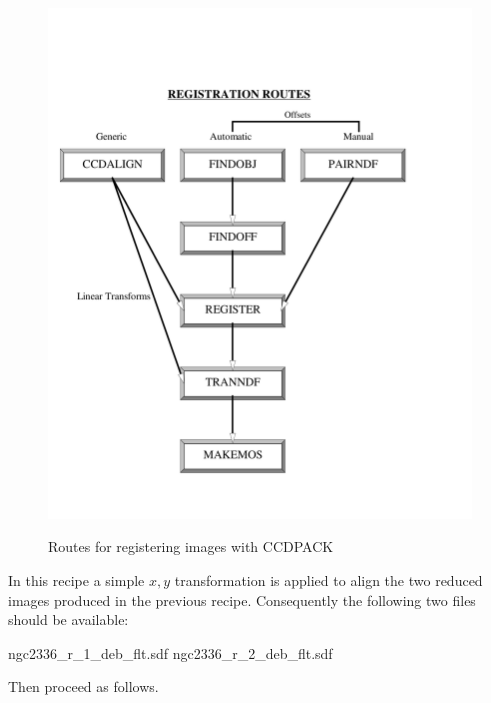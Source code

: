 \documentclass[twoside,11pt]{starlink}
\begin{document}
\begin{figure}[htbp]
  \centering
  \includegraphics[totalheight=7in]{sc5_reg}
  \begin{quote}
  \caption{Routes for registering images with CCDPACK
  \label{REGROUTES} }
  \end{quote}
\end{figure}

In this recipe a simple $x,y$ transformation is applied to align the
two reduced images produced in the previous recipe.  Consequently
the following two files should be available:

\begin{terminalv}
ngc2336_r_1_deb_flt.sdf
ngc2336_r_2_deb_flt.sdf
\end{terminalv}

Then proceed as follows.
\end{document}
